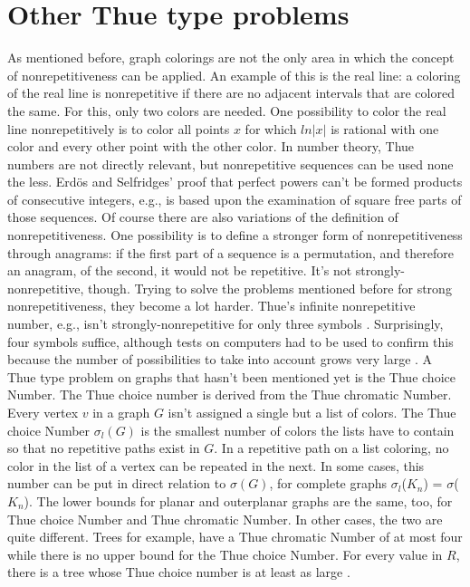 \documentclass[12pt,a4paper]{article}
\begin{document}
\section{Other Thue type problems}
As mentioned before, graph colorings are not the only area in which the concept of nonrepetitiveness can be applied. An example of this is the real line: a coloring of the real line is nonrepetitive if there are no adjacent intervals that are colored the same. For this, only two colors are needed. One possibility to color the real line nonrepetitively is to color all points $x$ for which $ln|x|$ is rational with one color and every other point with the other color\citep{Grytczuk2008}. 
\newline
In number theory, Thue numbers are not directly relevant, but nonrepetitive sequences can be used none the less. Erdös and Selfridges' proof that perfect powers can't be formed products of consecutive integers, e.g., is based upon the examination of square free parts of those sequences.
\newline
Of course there are also variations of the definition of nonrepetitiveness. One possibility is to define a stronger form of nonrepetitiveness through anagrams: if the first part of a sequence is a permutation, and therefore an anagram, of the second, it would not be repetitive. It's not strongly-nonrepetitive, though. Trying to solve the problems mentioned before for strong nonrepetitiveness, they become a lot harder. Thue's infinite nonrepetitive number, e.g., isn't strongly-nonrepetitive for only three symbols \citep{Grytczuk2008}. Surprisingly, four symbols suffice, although tests on computers had to be used to confirm this because the number of possibilities to take into account grows very large \citep{Keranen1992}.
\newline
A Thue type problem on graphs that hasn't been mentioned yet is the Thue choice Number. The Thue choice number is derived from the Thue chromatic Number. Every vertex $v$ in a graph $G$ isn't assigned a single but a list of colors. The Thue choice Number $\sigma_l(G)$ is the smallest number of colors the lists have to contain so that no repetitive paths exist in $G$. In a repetitive path on a list coloring, no color in the list of a vertex can be repeated in the next. In some cases, this number can be put in direct relation to $\sigma(G)$, for complete graphs $\sigma_l$($K_n$) = $\sigma$($K_n$). The lower bounds for planar and outerplanar graphs are the same, too, for Thue choice Number and Thue chromatic Number. In other cases, the two are quite different. Trees for example, have a Thue chromatic Number of at most four while there is no upper bound for the Thue choice Number. For every value in $R$, there is a tree whose Thue choice number is at least as large \citep{Skrabulakova2015}.
\end{document}
